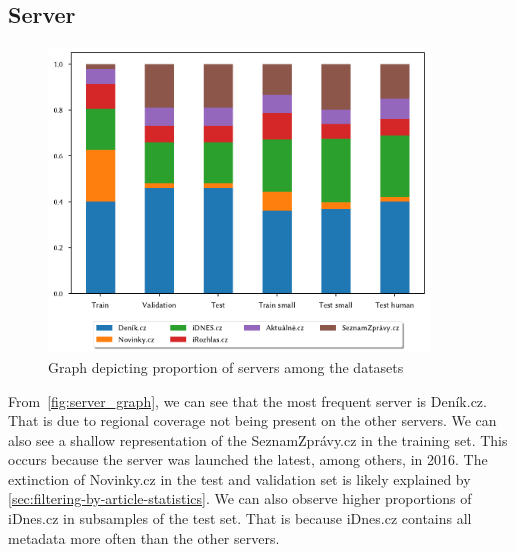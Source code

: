 \subsection{Server}
\label{sec:server-desc}
\begin{figure}[H]
    \centering
    \includegraphics[width=0.9\textwidth]{img/tasks_graph/server.pdf}
    \caption{Graph depicting proportion of servers among the datasets}
    \label{fig:server_graph}
\end{figure}
From~\autoref{fig:server_graph}, we can see that the most frequent server is Deník.cz.
That is due to regional coverage not being present on the other servers. We can also see
a shallow representation of the SeznamZprávy.cz in the training set.
This occurs because the server was launched the latest, among others, in 2016.
The extinction of Novinky.cz in the test and validation set is likely explained by \autoref{sec:filtering-by-article-statistics}.
We can also observe higher proportions of iDnes.cz in subsamples of the test set.
That is because iDnes.cz contains all metadata more often than the other servers.


